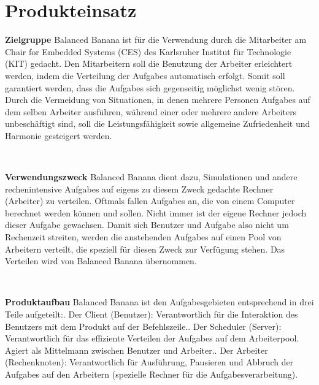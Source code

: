 \documentclass[a4paper,12pt]{article}
\begin{document}
\section{Produkteinsatz}
\begin{itemize}
\begin{minipage}[t]{\linewidth}
\item \textbf{Zielgruppe}\newline
Balanced Banana ist für die Verwendung durch die Mitarbeiter am Chair for Embedded Systems (CES) des Karlsruher Institut für Technologie (KIT) gedacht.\newline
Den Mitarbeitern soll die Benutzung der \gls{Arbeiter} erleichtert werden, indem die Verteilung der \glspl{Aufgabe} automatisch erfolgt. Somit soll garantiert werden, dass die \glspl{Aufgabe} sich gegenseitig möglichst wenig stören.\newline
Durch die Vermeidung von Situationen, in denen mehrere Personen \glspl{Aufgabe} auf dem selben \gls{Arbeiter} ausführen, während einer oder mehrere andere \glspl{Arbeiter} unbeschäftigt sind, soll die Leistungsfähigkeit sowie allgemeine Zufriedenheit und Harmonie gesteigert werden.
\end{minipage}
\\

\begin{minipage}[t]{\linewidth}
\item \textbf{Verwendungszweck}\newline
Balanced Banana dient dazu, Simulationen und andere rechenintensive \glspl{Aufgabe} auf eigens zu diesem Zweck gedachte Rechner (\gls{Arbeiter}) zu verteilen.\newline
Oftmals fallen \glspl{Aufgabe} an, die von einem Computer berechnet werden können und sollen. Nicht immer ist der eigene Rechner jedoch dieser \gls{Aufgabe} gewachsen. Damit sich \gls{Benutzer} und \gls{Aufgabe} also nicht um Rechenzeit streiten, werden die anstehenden \glspl{Aufgabe} auf einen Pool von Arbeitern verteilt, die speziell für diesen Zweck zur Verfügung stehen. Das Verteilen wird von Balanced Banana übernommen.
\end{minipage}
\\

\begin{minipage}[t]{\linewidth}
\item \textbf{Produktaufbau}\newline
Balanced Banana ist den \glspl{Aufgabe}gebieten entsprechend in drei Teile aufgeteilt:. Der \gls{Client} (\gls{Benutzer}): Verantwortlich für die Interaktion des \gls{Benutzer}s mit dem Produkt auf der \gls{Befehlszeile}.. Der \gls{Scheduler} (\gls{Server}): Verantwortlich für das effiziente Verteilen der \glspl{Aufgabe} auf dem Arbeiterpool. Agiert als Mittelmann zwischen \gls{Benutzer} und \gls{Arbeiter}.. Der \gls{Arbeiter} (Rechenknoten): Verantwortlich für Ausführung, Pausieren und Abbruch der \glspl{Aufgabe} auf den Arbeitern (spezielle Rechner für die \glspl{Aufgabe}verarbeitung).
\end{minipage}
\end{itemize}
\newpage
\end{document}
